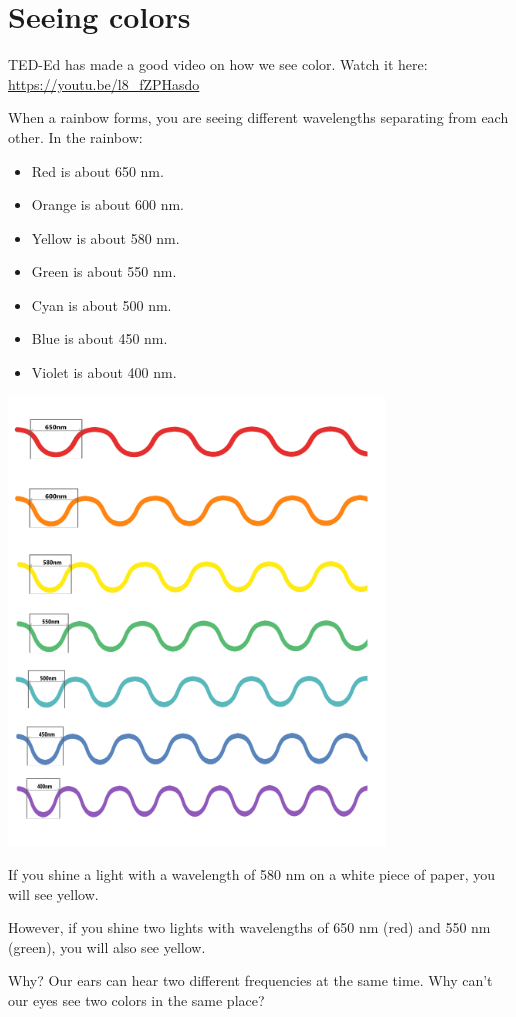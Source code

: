 \section{Seeing colors}

TED-Ed has made a good video on how we see color. Watch it here: \url{https://youtu.be/l8_fZPHasdo}

When a rainbow forms, you are seeing different wavelengths separating from each other. In the rainbow:
\begin{itemize}
\item Red is about 650 nm.
\item Orange is about 600 nm.
\item Yellow is about 580 nm.
\item Green is about 550 nm.
\item Cyan is about 500 nm.
\item Blue is about 450 nm.
\item Violet is about 400 nm.
\end{itemize}

\includegraphics[width=0.75\textwidth]{Color_Waves.png}

If you shine a light with a wavelength of 580 nm on a white piece of
paper, you will see yellow.

However, if you shine two lights with wavelengths of 650 nm (red) and
550 nm (green), you will also see yellow.

Why? Our ears can hear two different frequencies at the same time.
Why can't our eyes see two colors in the same place?

